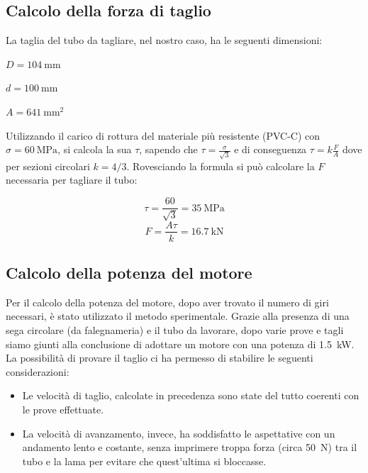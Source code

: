 \documentclass{report}
\begin{document}
\subsection{Calcolo della forza di taglio}
La taglia del tubo da tagliare, nel nostro caso, ha le seguenti dimensioni:
\begin{description}
\item $D = \SI{104}{\mm}$
\item $d = \SI{100}{\mm}$
\item $A = \SI{641}{\mm\squared}$
\end{description}

Utilizzando il carico di rottura del materiale più resistente (PVC-C) con $\sigma = \SI{60}{\MPa}$, si calcola la sua $\tau$, sapendo che $\tau = \frac{\sigma}{\sqrt{3}}$ e di conseguenza $\tau = k\frac{F}{A}$ dove per sezioni circolari $k=4/3$. Rovesciando la formula si può calcolare la $F$ necessaria per tagliare il tubo:

\begin{equation}
\tau=\frac{60}{\sqrt{3}} = \SI{35}{\MPa}
\end{equation}
\begin{equation}
F = \frac{A\tau}{k} = \SI{16,7}{\kN}
\end{equation}

\subsection{Calcolo della potenza del motore}
Per il calcolo della potenza del motore, dopo aver trovato il numero di giri necessari, è stato utilizzato il metodo sperimentale. Grazie alla presenza di una sega circolare (da falegnameria) e il tubo da lavorare, dopo varie prove e tagli siamo giunti alla conclusione di adottare un motore con una potenza di \SI{1,5}{\kW}. La possibilità di provare il taglio ci ha permesso di stabilire le seguenti considerazioni:
\begin{itemize}
\item Le velocità di taglio, calcolate in precedenza sono state del tutto coerenti con le prove effettuate.
\item La velocità di avanzamento, invece, ha soddisfatto le aspettative con un andamento lento e costante, senza imprimere troppa forza (circa \SI{50}{\N}) tra il tubo e la lama per evitare che quest'ultima si bloccasse.
  \end{itemize}
\end{document}
